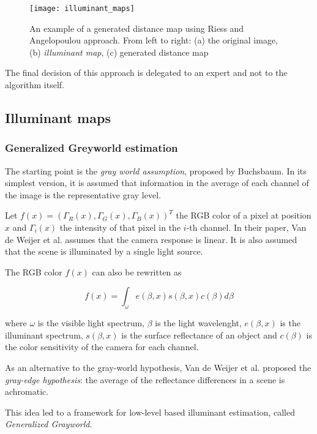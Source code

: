 \begin{figure}
  \centering
    \texttt{[image: illuminant\_maps]}
    \caption{An example of a generated distance map using Riess and Angelopoulou\cite{riess2010scene} approach. From left to right: (a) the original image, (b) \emph{illuminant map}, (c) generated distance map}
    \label{illuminant_maps}
\end{figure}

The final decision of this approach is delegated to an expert and not to the algorithm itself.

\subsection{Illuminant maps}


\subsubsection{Generalized Greyworld estimation}

The starting point is the \emph{gray world assumption}, proposed by Buchsbaum\cite{Buchsbaum19801}. In its simplest version, it is assumed that information in the average of each channel of the image is the representative gray level.

Let $f(x) = (\Gamma_R(x), \Gamma_G(x), \Gamma_B(x))^T$ the RGB color of a pixel at position $x$ and $\Gamma_i(x)$ the intensity of that pixel in the $i$-th channel. In their paper, Van de Weijer et al. assumes that the camera response is linear. It is also assumed that the scene is illuminated by a single light source.

The RGB color $f(x)$ can also be rewritten as

\begin{equation}
f(x) = \int_{\omega} e(\beta, x) s(\beta, x) c(\beta) d\beta
\end{equation}

where $\omega$ is the visible light spectrum, $\beta$ is the light wavelenght, $e(\beta, x)$ is the illuminant spectrum, $s(\beta, x)$ is the surface reflectance of an object and $c(\beta)$ is the color sensitivity of the camera for each channel.

As an alternative to the gray-world hypothesis, Van de Weijer et al.\cite{van2007edge} proposed the \emph{gray-edge hypothesis}: the average of the reflectance differences in a scene is achromatic.

This idea led to a framework for low-level based illuminant estimation, called \emph{Generalized Grayworld}.

